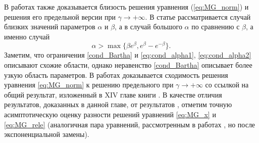 В работах \cite{Bartha2021,Krisztin2020} также доказывается близость решения уравнения (\ref{eq:MG_norm}) и решения его предельной версии при $\gamma\to+\infty$. В статье \cite{Krisztin2020} рассматривается случай близких значений параметров $\alpha$ и $\beta$, а в \cite{Bartha2021} случай большого $\alpha$  по сравнению с $\beta$, а именно случай 
\begin{equation}
	\label{cond_Bartha}
	\alpha>\max\{\beta e^\beta, e^\beta-e^{-\beta}\}.
\end{equation}
Заметим, что ограничения \eqref{cond_Bartha} и \eqref{eq:cond_alpha1}, \eqref{eq:cond_alpha2} описывают схожие области, однако неравенство \eqref{cond_Bartha} описывает более узкую область параметров. 
В работах \cite{Bartha2021,Krisztin2020} доказывается сходимость решения уравнения \eqref{eq:MG_norm} к решению предельного при $\gamma\to+\infty$ со ссылкой на общий результат, изложенный в XIV главе книги \cite{Diekmann1995}.
В качестве отличия результатов, доказанных в данной главе, от результатов \cite{Bartha2021}, отметим точную асимптотическую оценку разности решений уравнений \eqref{eq:MG_x} и \eqref{eq:MG_rele} (аналогичная пара уравнений, рассмотренным в  работах \cite{Bartha2021,Krisztin2020}, но после экспоненциальной замены).



